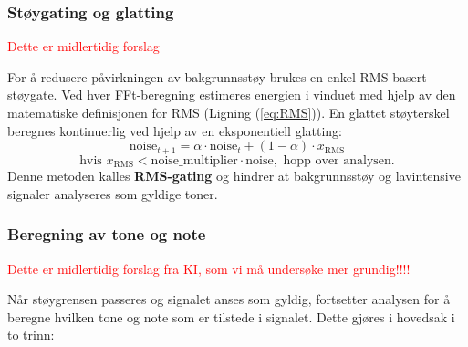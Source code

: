 \subsubsection{Støygating og glatting}
\textcolor{red}{Dette er midlertidig forslag}

For å redusere påvirkningen av bakgrunnsstøy brukes en enkel RMS-basert støygate. Ved hver FFt-beregning estimeres energien i vinduet med hjelp av den matematiske definisjonen for RMS (Ligning (\ref{eq:RMS})). En glattet støyterskel beregnes kontinuerlig ved hjelp av en eksponentiell glatting:
\[
\text{noise}_{t+1} = \alpha \cdot \text{noise}_t + (1 - \alpha) \cdot x_{\text{RMS}}
\]
\[
\text{hvis } x_{\text{RMS}} < \text{noise\_multiplier} \cdot \text{noise}, \text{ hopp over analysen.}
\]
Denne metoden kalles \textbf{RMS-gating} og hindrer at bakgrunnsstøy og lavintensive signaler analyseres som gyldige toner.
\subsubsection{Beregning av tone og note}
\textcolor{red}{Dette er midlertidig forslag fra KI, som vi må undersøke mer grundig!!!!}

Når støygrensen passeres og signalet anses som gyldig, fortsetter analysen for å beregne hvilken tone og note som er tilstede i signalet. Dette gjøres i hovedsak i to trinn:

